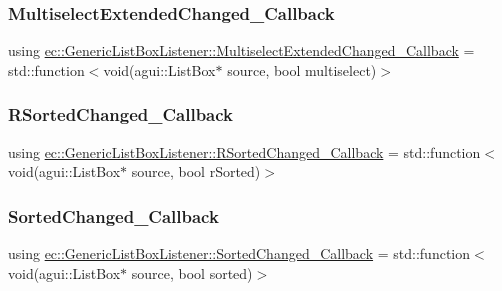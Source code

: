 \subsubsection{\texorpdfstring{Multiselect\+Extended\+Changed\+\_\+\+Callback}{MultiselectExtendedChanged\_Callback}}
{\footnotesize\ttfamily using \mbox{\hyperlink{classec_1_1_generic_list_box_listener_afafcf69d328d0d728142a5153e0b9790}{ec\+::\+Generic\+List\+Box\+Listener\+::\+Multiselect\+Extended\+Changed\+\_\+\+Callback}} =  std\+::function$<$void(agui\+::\+List\+Box$\ast$ source, bool multiselect)$>$}

\mbox{\label{classec_1_1_generic_list_box_listener_a6e2b38bbcd32c3716e7660fc40c4054c}} 
\subsubsection{\texorpdfstring{R\+Sorted\+Changed\+\_\+\+Callback}{RSortedChanged\_Callback}}
{\footnotesize\ttfamily using \mbox{\hyperlink{classec_1_1_generic_list_box_listener_a6e2b38bbcd32c3716e7660fc40c4054c}{ec\+::\+Generic\+List\+Box\+Listener\+::\+R\+Sorted\+Changed\+\_\+\+Callback}} =  std\+::function$<$void(agui\+::\+List\+Box$\ast$ source, bool r\+Sorted)$>$}

\mbox{\label{classec_1_1_generic_list_box_listener_a42ecf66ec6c32bbe9fe0174b2b1a527f}} 
\subsubsection{\texorpdfstring{Sorted\+Changed\+\_\+\+Callback}{SortedChanged\_Callback}}
{\footnotesize\ttfamily using \mbox{\hyperlink{classec_1_1_generic_list_box_listener_a42ecf66ec6c32bbe9fe0174b2b1a527f}{ec\+::\+Generic\+List\+Box\+Listener\+::\+Sorted\+Changed\+\_\+\+Callback}} =  std\+::function$<$void(agui\+::\+List\+Box$\ast$ source, bool sorted)$>$}



